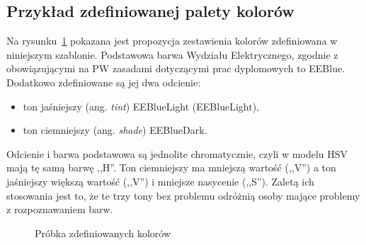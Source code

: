 \subsection{Przykład zdefiniowanej palety kolorów}
Na rysunku~\ref{rys:colorsample} pokazana jest propozycja zestawienia kolorów zdefiniowana w niniejszym szablonie. Podstawowa barwa Wydziału Elektrycznego, zgodnie z obowiązującymi na PW zasadami dotyczącymi prac dyplomowych to \textcolor{EEBlue}{EEBlue}. Dodatkowo zdefiniowane są jej dwa odcienie:
\begin{itemize}
    \item ton jaśniejszy (ang. \textit{tint}) \textcolor{EEBlueLight}{EEBlueLight} (EEBlueLight),
    \item ton ciemniejszy (ang. \textit{shade}) \textcolor{EEBlueDark}{EEBlueDark}.
\end{itemize}
Odcienie i barwa podstawowa są jednolite chromatycznie, czyli w modelu HSV mają tę samą barwę ,,H''. Ton ciemniejszy ma mniejszą wartość (,,V'') a ton jaśniejszy większą wartość (,,V'') i mniejsze nasycenie (,,S''). Zaletą ich stosowania jest to, że te trzy tony bez problemu odróżnią osoby mające problemy z rozpoznawaniem barw. 

\begin{figure}[!ht]
    \centering
    \caption{Próbka zdefiniowanych kolorów}
    \label{rys:colorsample}
\end{figure}

